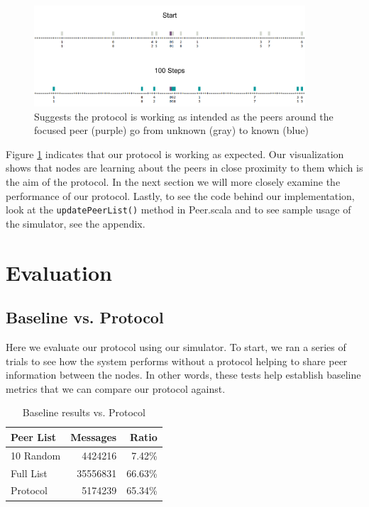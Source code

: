 \documentclass[letterpaper,11pt,twocolumn]{article}
\begin{document}
\begin{figure}[ht]
  \centering
   \includegraphics[width=0.9\textwidth]{images/protocol_impact.png}     
  \caption{Suggests the protocol is working as intended as the peers around the focused peer (purple) go from unknown (gray) to known (blue)
           \label{protocol-impact}}
\end{figure} 


Figure \ref{protocol-impact} indicates that our protocol is working as expected. Our visualization shows that nodes are learning about the peers in close proximity to them which is the aim of the protocol. In the next section we will more closely examine the performance of our protocol. Lastly, to see the code behind our implementation, look at the \texttt{updatePeerList()} method in Peer.scala and to see sample usage of the simulator, see the appendix. 


\section{Evaluation}

\subsection{Baseline vs. Protocol}

Here we evaluate our protocol using our simulator. To start, we ran a series of trials to see how the system performs without a protocol helping to share peer information between the nodes. In other words, these tests help establish baseline metrics that we can compare our protocol against. 

\begin{table}[h]
  \centering
  \begin{tabular}{l || r | r}

  Peer List & Messages & Ratio \\ \hline \hline
  10 Random & 4424216 & 7.42\%  \\ \hline
  Full List & 35556831 & 66.63\% \\ \hline
  Protocol & 5174239 & 65.34\%
  \end{tabular}
  \caption{Baseline results vs. Protocol
    \label{baseline-results}}
\end{table}
\end{document}
